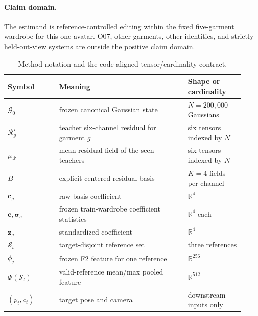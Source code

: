 \paragraph{Claim domain.}
The estimand is reference-controlled editing within the fixed five-garment wardrobe for this one avatar. O07, other garments, other identities, and strictly held-out-view systems are outside the positive claim domain.

\begin{table}[t]
\centering
\small
\begin{tabular}{@{}p{0.20\linewidth}p{0.50\linewidth}p{0.22\linewidth}@{}}
\toprule
Symbol & Meaning & Shape or cardinality \\
\midrule
$\mathcal{G}_0$ & frozen canonical Gaussian state & $N=200{,}000$ Gaussians \\
$\mathcal{R}_g^{\star}$ & teacher six-channel residual for garment $g$ & six tensors indexed by $N$ \\
$\mu_{\mathcal{R}}$ & mean residual field of the seen teachers & six tensors indexed by $N$ \\
$B$ & explicit centered residual basis & $K=4$ fields per channel \\
$\mathbf{c}_g$ & raw basis coefficient & $\mathbb{R}^{4}$ \\
$\bar{\mathbf c},\boldsymbol{\sigma}_{c}$ & frozen train-wardrobe coefficient statistics & $\mathbb{R}^{4}$ each \\
$\mathbf{z}_g$ & standardized coefficient & $\mathbb{R}^{4}$ \\
$\mathcal{S}_t$ & target-disjoint reference set & three references \\
$\phi_j$ & frozen F2 feature for one reference & $\mathbb{R}^{256}$ \\
$\Phi(\mathcal{S}_t)$ & valid-reference mean/max pooled feature & $\mathbb{R}^{512}$ \\
$(p_t,c_t)$ & target pose and camera & downstream inputs only \\
\bottomrule
\end{tabular}
\caption{Method notation and the code-aligned tensor/cardinality contract.}
\end{table}
